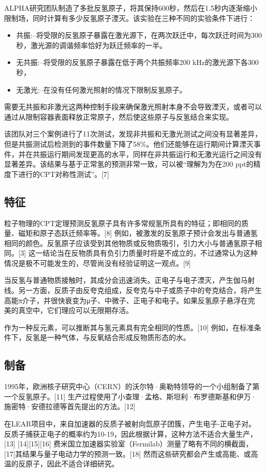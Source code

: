 ALPHA研究团队制造了多批反氢原子，将其保持600秒，然后在1.5秒内逐渐缩小限制场，同时计算有多少反氢原子湮灭。该实验在三种不同的实验条件下进行：
\begin{itemize}
\item 共振:–将受限的反氢原子暴露在激光源下，在两次跃迁中，每次跃迁时间为300秒，激光源的调谐频率恰好为跃迁频率的一半。
\item 无共振:–将受限的反氢原子暴露在低于两个共振频率200 kHz的激光源下各300秒，
\item 无激光:–在没有任何激光照射的情况下限制反氢原子。
\end{itemize}
需要无共振和非激光这两种控制手段来确保激光照射本身不会导致湮灭，或者可以通过从限制容器表面释放正常原子，然后使这些原子与反氢结合来实现。

该团队对三个案例进行了11次测试，发现非共振和无激光测试之间没有显著差异，但是共振测试后检测到的事件数量下降了58\%。他们还能够在运行期间计算湮灭事件，并在共振运行期间发现更高的水平，同样在非共振运行和无激光运行之间没有显著差异。该结果与基于正常氢的预测非常一致，可以被“理解为为在200 ppt的精度下进行的CPT对称性测试”。[7]

\subsection{特征}
粒子物理的CPT定理预测反氢原子具有许多常规氢所具有的特征；即相同的质量、磁矩和原子态跃迁频率等。[8] 例如，被激发的反氢原子预计会发出与普通氢相同的颜色。反氢原子应该受到其他物质或反物质吸引，引力大小与普通氢原子相同。[3] 这一结论当在反物质具有负引力质量时将是不成立的，不过通常认为这种情况是极不可能发生的，尽管尚没有经验证明这一观点。[9]

当反氢与普通物质接触时，其成分会迅速消失。正电子与电子湮灭，产生伽马射线。另一方面，反质子由反夸克组成，反夸克与中子或质子中的夸克结合，将产生高能π介子，并很快衰变为μ子、中微子、正电子和电子。如果反氢原子悬浮在完美的真空中，它们理应可以无限期存活。

作为一种反元素，可以推断其与氢元素具有完全相同的性质。[10] 例如，在标准条件下，反氢是一种气体，与反氧结合形成反物质形态的水。

\subsection{制备}
1995年，欧洲核子研究中心（CERN）的沃尔特·奥勒特领导的一个小组制备了第一个反氢原子。[11] 生产过程使用了小查理·孟格、斯坦利·布罗德斯基和伊万·施密特·安德拉德等首先提出的方法。[12]

在LEAR项目中，来自加速器的反质子被射向氙原子团簇，产生电子-正电子对。反质子捕获正电子的概率约为10-19，因此根据计算，这种方法不适合大量生产，[13] [14][15][16] 费米国立加速器实验室（Fermilab）测量了略有不同的横截面，[17]其结果与量子电动力学的预测一致。[18] 然而这些研究都会产生或高能、或高温的反原子，因此不适合详细研究。

